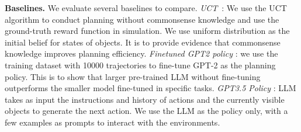 \textbf{Baselines.} 
We evaluate several baselines to compare. \textit{UCT}~\cite{kocsis2006bandit}: We use the UCT algorithm to conduct planning without commonsense knowledge and use the ground-truth reward function in simulation. We use uniform distribution as the initial belief for states of objects. It is to provide evidence that commonsense knowledge improves planning efficiency.
\textit{Finetuned GPT2 policy} \cite{li2022pre}: we use the training dataset with 10000 trajectories to fine-tune GPT-2 as the planning policy. This is to show that larger pre-trained LLM without fine-tuning outperforms the smaller model fine-tuned in specific tasks. 
\textit{GPT3.5 Policy} \cite{huang2022language}: 
LLM takes as input the instructions and history of actions and the currently visible objects to generate the next action. 
We use the LLM as the policy only, with a few examples as prompts to interact with the environments. 
